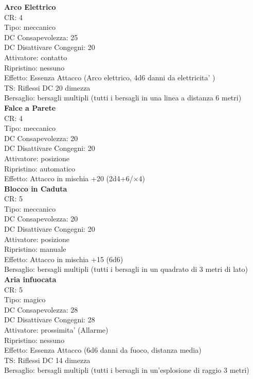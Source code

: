 \documentclass[a4paper,11pt,twoside,openany]{book}
\begin{document}
{\begin{multicols}{2}
			\textbf{Arco Elettrico}\\
			CR: 4 \\
			Tipo: meccanico \\
			DC Consapevolezza: 25 \\
			DC Disattivare Congegni: 20 \\
			Attivatore: contatto \\
			Ripristino: nessuno \\
			Effetto: Essenza Attacco (Arco elettrico, 4d6 danni da elettricita' )\\
			TS: Riflessi DC 20 dimezza \\
			Bersaglio: bersagli multipli (tutti i bersagli in una linea a distanza 6 metri)\\
			
			\textbf{Falce a Parete}\\
			CR: 4 \\
			Tipo: meccanico \\
			DC Consapevolezza: 20 \\
			DC Disattivare Congegni: 20 \\
			Attivatore: posizione \\
			Ripristino: automatico \\
			Effetto: Attacco in mischia +20 (2d4+6/×4)\\
			
			\textbf{Blocco in Caduta}\\
			CR: 5 \\
			Tipo: meccanico \\
			DC Consapevolezza: 20 \\
			DC Disattivare Congegni: 20 \\
			Attivatore: posizione \\
			Ripristino: manuale \\
			Effetto: Attacco in mischia +15 (6d6) \\
			Bersaglio: bersagli multipli (tutti i bersagli in un quadrato di 3 metri di lato)\\
			
			\textbf{Aria infuocata}\\
			CR: 5 \\
			Tipo: magico \\
			DC Consapevolezza: 28 \\
			DC Disattivare Congegni: 28 \\
			Attivatore: prossimita' (Allarme) \\
			Ripristino: nessuno \\
			Effetto: Essenza Attacco (6d6 danni da fuoco, distanza media)\\
			TS: Riflessi DC 14 dimezza \\
			Bersaglio: bersagli multipli (tutti i bersagli in un’esplosione di raggio 3 metri)\\
			

\end{multicols}}
\end{document}
